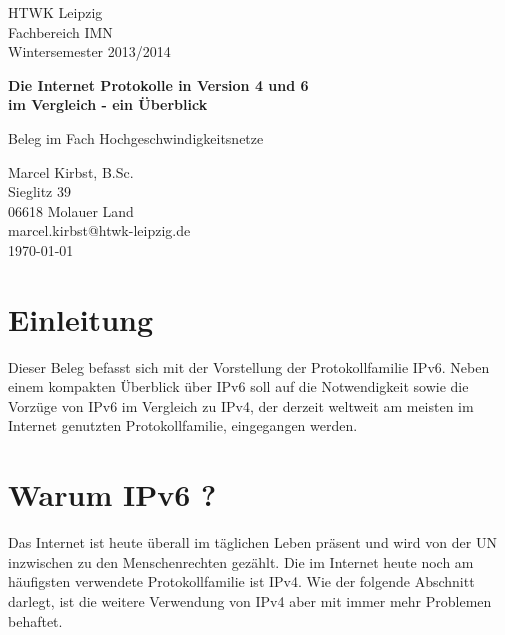 \documentclass[a4paper,12pt]{scrartcl}
\begin{document}
 
\begin{titlepage}
\begin{small}
\vfill {HTWK Leipzig\\
Fachbereich IMN \\
Wintersemester 2013/2014}
\end{small}
 
\begin{center}
\begin{Large}
\vfill {\textsf{\textbf{
Die Internet Protokolle in Version 4 und 6\\
im Vergleich - ein \"Uberblick\\
}}}
\end{Large}
Beleg im Fach Hochgeschwindigkeitsnetze
\end{center}
 
\begin{small}
\vfill Marcel Kirbst, B.Sc. \\ Sieglitz 39 \\ 06618 Molauer Land \\
marcel.kirbst@htwk-leipzig.de\\
\today
\end{small}
 
\end{titlepage}
 
\tableofcontents
\thispagestyle{empty}
 
\clearpage
 
\onehalfspacing
 
\pagestyle{plain}
 
\section{Einleitung}
Dieser Beleg befasst sich mit der Vorstellung der Protokollfamilie IPv6. Neben einem kompakten Überblick über IPv6 soll auf die Notwendigkeit sowie die Vorzüge von IPv6 im Vergleich zu IPv4, der derzeit weltweit am meisten im Internet genutzten Protokollfamilie, eingegangen werden.

\clearpage
\section{Warum IPv6 ?}
Das Internet ist heute überall im täglichen Leben präsent und wird von der UN inzwischen zu den Menschenrechten gezählt.\cite{uninet} Die im Internet heute noch am häufigsten verwendete Protokollfamilie ist IPv4. Wie der folgende Abschnitt darlegt, ist die weitere Verwendung von IPv4 aber mit immer mehr Problemen behaftet.
\end{document}
